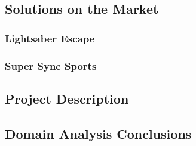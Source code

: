\subsection{Solutions on the Market}

\subsubsection{Lightsaber Escape} %

\subsubsection{Super Sync Sports} %

\subsection{Project Description}

\subsection{Domain Analysis Conclusions}

\clearpage
